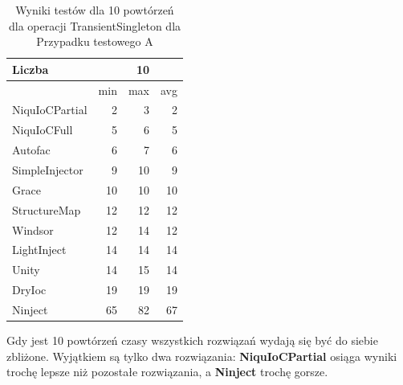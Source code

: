 \documentclass[12pt]{article}
\begin{document}
\begin{table}[H]
\captionsetup{belowskip=0pt,aboveskip=0pt}
\begin{center}
\begin{small}
	\begin{tabular}{ | l | r r r | }
    		\hline
Liczba & & 10 & \\ \hline
 & min & max & avg \\ \hline
NiquIoCPartial & 2 & 3 & 2 \\ \hline
NiquIoCFull & 5 & 6 & 5 \\ \hline
Autofac & 6 & 7 & 6 \\ \hline
SimpleInjector & 9 & 10 & 9 \\ \hline
Grace & 10 & 10 & 10 \\ \hline
StructureMap & 12 & 12 & 12 \\ \hline
Windsor & 12 & 14 & 12 \\ \hline
LightInject & 14 & 14 & 14 \\ \hline
Unity & 14 & 15 & 14 \\ \hline
DryIoc & 19 & 19 & 19 \\ \hline
Ninject & 65 & 82 & 67 \\ \hline
  	\end{tabular}
\end{small}
\end{center}
\caption{Wyniki testów dla 10 powtórzeń dla operacji TransientSingleton dla Przypadku testowego A}
\label{TestCaseA_TransientSingleton10}
\end{table}
Gdy jest 10 powtórzeń czasy wszystkich rozwiązań wydają się być do siebie zbliżone. Wyjątkiem są tylko dwa rozwiązania: \textbf{NiquIoCPartial} osiąga wyniki trochę lepsze niż pozostałe rozwiązania, a \textbf{Ninject} trochę gorsze.
\\ \\
\end{document}
